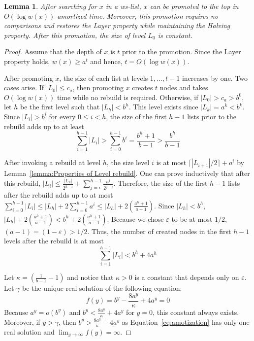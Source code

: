 \documentclass[11pt]{article}       %
\newtheorem{lemma}{Lemma}
\newcommand{\wlist}{ws-list\xspace}
\newcommand{\halving}{Halving property\xspace}
\newcommand{\layer}{Layer property\xspace}
\begin{document}
\begin{lemma}\label{lemma:Amortized cost}
After searching for $x$ in a \wlist, $x$ can be promoted to the top in $O(\log w(x))$ amortized time. 
Moreover, this promotion requires no comparisons and restores the \layer while maintaining the \halving.
After this promotion, the size of level $L_0$ is constant.
\end{lemma}
\begin{proof}
Assume that the depth of $x$ is $t$ prior to the promotion. 
Since the \layer holds, $w(x) \geq a^t$ and hence, $t = O(\log w(x))$. 

After promoting $x$, the size of each list at levels $1, \ldots, t-1$ increases by one. 
Two cases arise. If $|L_0| \leq c_a$, then promoting $x$ creates $t$ nodes and takes $O(\log w(x))$ time while no rebuild is required.
Otherwise, if $|L_0| > c_a> b^0$, let $h$ be the first level such that $|L_h| < b^h$. 
This level exists since $|L_k| = a^k < b^k$.
Since $|L_i| > b^i$ for every $0\leq i< h$, the size of the first $h-1$ lists prior to the rebuild adds up to at least 
\begin{equation}\label{eq:Size before}
\sum_{i=1}^{h-1} |L_i| > \sum_{i=0}^{h-1} b^i  = \frac{b^h +1}{b-1} > \frac{b^h}{b-1}
\end{equation}

After invoking a rebuild at level $h$, the size level $i$ is at most $\lceil |L_{i+1}|/2\rceil + a^i$ by Lemma~\ref{lemma:Properties of Level rebuild}. One can prove inductively that after this rebuild, $|L_i| \leq \frac{|L_h|}{2^{h-i}} + \sum_{j=i}^{h-1} \frac{a^j}{2^{j-i}}$.
Therefore, the size of the first $h-1$ lists after the rebuild adds up to at most
$\sum_{i=0}^{h-1} |L_i| \leq |L_h| + 2\sum_{i=0}^{h-1} a^i \leq |L_h| + 2\left(\frac{a^h +1}{a-1}\right)$. 
Since $|L_h| < b^h$,  $|L_h| + 2\left(\frac{a^h +1}{a-1}\right) < b^h + 2\left(\frac{a^h +1}{a-1}\right)$.
Because we chose $\varepsilon$ to be at most $1/2$, $(a-1) = (1-\varepsilon) > 1/2$. Thus, the number of created nodes in the first $h-1$ levels after the rebuild is at most 
\begin{equation}\label{eq:Size after}
\sum_{i=1}^{h-1} |L_i| < b^h + 4 a^h
\end{equation}


Let $\kappa = \left(\frac{1}{b-1} - 1\right)$ and notice that $\kappa>0$ is a constant that depends only on $\varepsilon$.
Let $\gamma$ be the unique real solution of the following equation:
\begin{equation}\label{eq:amotization}
f(y) = b^y - \frac{8a^y}{\kappa} + 4a^y = 0
\end{equation}
Because $a^y = o(b^y)$ and $b^y< \frac{8a^y}{\kappa} + 4a^y$ for $y=0$, this constant always exists. 
Moreover, if $y>\gamma$, then $b^y > \frac{8a^y}{\kappa} - 4a^y$ as Equation~\ref{eq:amotization} has only one real solution and $\lim_{y\to \infty} f(y) = \infty$. 



\end{proof}
\end{document}
